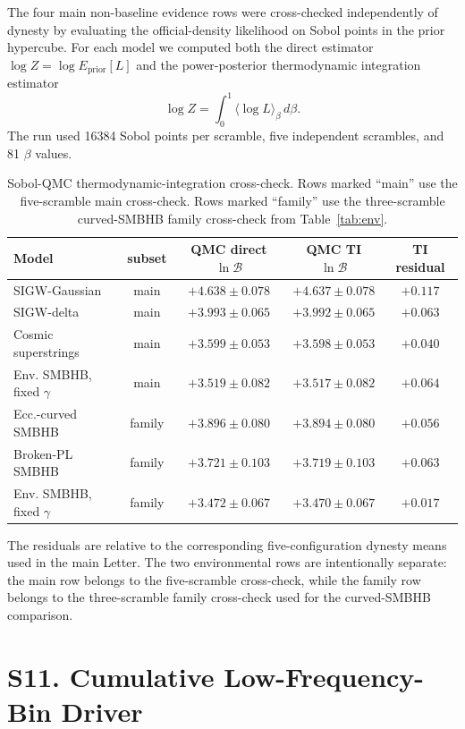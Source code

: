 \documentclass[aps,prl,superscriptaddress,nofootinbib]{revtex4-2}
\begin{document}
The four main non-baseline evidence rows were cross-checked independently of
dynesty by evaluating the official-density likelihood on Sobol points in the
prior hypercube.  For each model we computed both the direct estimator
$\log Z=\log E_\mathrm{prior}[L]$ and the power-posterior thermodynamic
integration estimator
\begin{equation}
\log Z=\int_0^1 \langle \log L\rangle_\beta\,d\beta .
\end{equation}
The run used 16384 Sobol points per scramble, five independent scrambles, and
81 $\beta$ values.

\begin{table}[H]
\caption{\label{tab:tiqmc}Sobol-QMC thermodynamic-integration cross-check.
Rows marked ``main'' use the five-scramble main cross-check.  Rows marked
``family'' use the three-scramble curved-SMBHB family cross-check from
Table~\ref{tab:env}.}
\begin{ruledtabular}
\begin{tabular}{lcccc}
Model & subset & QMC direct $\ln\mathcal{B}$ & QMC TI $\ln\mathcal{B}$ & TI residual \\
\hline
SIGW-Gaussian & main & $+4.638\pm0.078$ & $+4.637\pm0.078$ & $+0.117$ \\
SIGW-delta & main & $+3.993\pm0.065$ & $+3.992\pm0.065$ & $+0.063$ \\
Cosmic superstrings & main & $+3.599\pm0.053$ & $+3.598\pm0.053$ & $+0.040$ \\
Env. SMBHB, fixed $\gamma$ & main & $+3.519\pm0.082$ & $+3.517\pm0.082$ & $+0.064$ \\
Ecc.-curved SMBHB & family & $+3.896\pm0.080$ & $+3.894\pm0.080$ & $+0.056$ \\
Broken-PL SMBHB & family & $+3.721\pm0.103$ & $+3.719\pm0.103$ & $+0.063$ \\
Env. SMBHB, fixed $\gamma$ & family & $+3.472\pm0.067$ & $+3.470\pm0.067$ & $+0.017$ \\
\end{tabular}
\end{ruledtabular}
\end{table}

The residuals are relative to the corresponding five-configuration dynesty
means used in the main Letter.  The two environmental rows are intentionally
separate: the main row belongs to the five-scramble cross-check, while the
family row belongs to the three-scramble family cross-check used for the
curved-SMBHB comparison.

\section*{S11. Cumulative Low-Frequency-Bin Driver}
\end{document}
